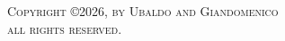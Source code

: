 \newpage
\thispagestyle{empty}
\addtocounter{page}{-1}
\vspace*{\fill}
\scshape \noindent Copyright \copyright 2026, by Ubaldo and Giandomenico \\
\noindent all rights reserved.
\vspace*{\fill}
\newpage
\rm